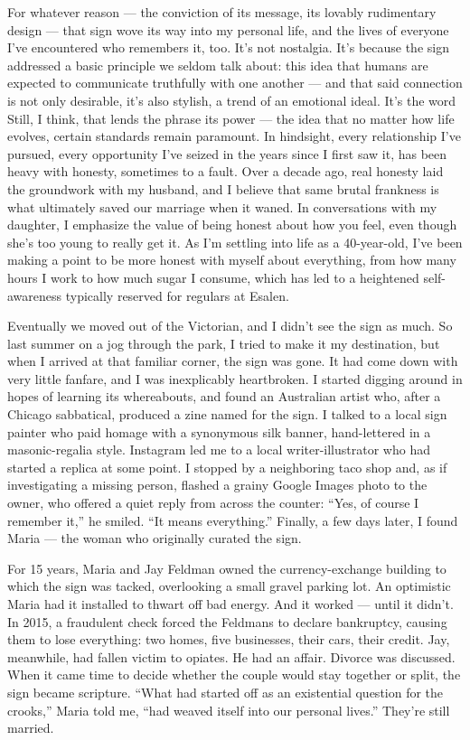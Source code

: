 For whatever reason --- the conviction of its message, its lovably
rudimentary design --- that sign wove its way into my personal life, and
the lives of everyone I've encountered who remembers it, too. It's not
nostalgia. It's because the sign addressed a basic principle we seldom
talk about: this idea that humans are expected to communicate truthfully
with one another --- and that said connection is not only desirable,
it's also stylish, a trend of an emotional ideal. It's the word Still, I
think, that lends the phrase its power --- the idea that no matter how
life evolves, certain standards remain paramount. In hindsight, every
relationship I've pursued, every opportunity I've seized in the years
since I first saw it, has been heavy with honesty, sometimes to a fault.
Over a decade ago, real honesty laid the groundwork with my husband, and
I believe that same brutal frankness is what ultimately saved our
marriage when it waned. In conversations with my daughter, I emphasize
the value of being honest about how you feel, even though she's too
young to really get it. As I'm settling into life as a 40-year-old, I've
been making a point to be more honest with myself about everything, from
how many hours I work to how much sugar I consume, which has led to a
heightened self-awareness typically reserved for regulars at Esalen.

Eventually we moved out of the Victorian, and I didn't see the sign as
much. So last summer on a jog through the park, I tried to make it my
destination, but when I arrived at that familiar corner, the sign was
gone. It had come down with very little fanfare, and I was inexplicably
heartbroken. I started digging around in hopes of learning its
whereabouts, and found an Australian artist who, after a Chicago
sabbatical, produced a zine named for the sign. I talked to a local sign
painter who paid homage with a synonymous silk banner, hand-lettered in
a masonic-regalia style. Instagram led me to a local writer-illustrator
who had started a replica at some point. I stopped by a neighboring taco
shop and, as if investigating a missing person, flashed a grainy Google
Images photo to the owner, who offered a quiet reply from across the
counter: ``Yes, of course I remember it,'' he smiled. ``It means
everything.'' Finally, a few days later, I found Maria --- the woman who
originally curated the sign.

For 15 years, Maria and Jay Feldman owned the currency-exchange building
to which the sign was tacked, overlooking a small gravel parking lot. An
optimistic Maria had it installed to thwart off bad energy. And it
worked --- until it didn't. In 2015, a fraudulent check forced the
Feldmans to declare bankruptcy, causing them to lose everything: two
homes, five businesses, their cars, their credit. Jay, meanwhile, had
fallen victim to opiates. He had an affair. Divorce was discussed. When
it came time to decide whether the couple would stay together or split,
the sign became scripture. ``What had started off as an existential
question for the crooks,'' Maria told me, ``had weaved itself into our
personal lives.'' They're still married.

